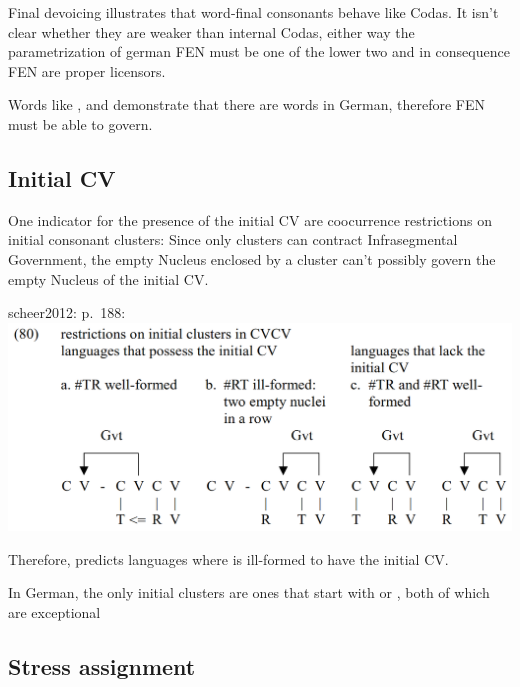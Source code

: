 Final devoicing illustrates that word-final consonants behave like Codas.
It isn't clear whether they are weaker than internal Codas, either way the
parametrization of german FEN must be one of the lower two and in consequence
FEN are proper licensors.

Words like ,  and  demonstrate that there
are  words in German, therefore FEN must be able to govern.


\subsection{Initial CV}
One indicator for the presence of the initial CV are coocurrence restrictions
on initial consonant clusters:
Since only  clusters can contract Infrasegmental Government,
the empty Nucleus enclosed by a  cluster can't possibly govern
the empty Nucleus of the initial CV.

scheer2012: p.~188:
\includegraphics[width=.5\textwidth]{figures/scheer2012_initial-cv-initial-clusters.png}

Therefore, \CVCV predicts languages where  is ill-formed to have
the initial CV.

In German, the only initial  clusters are ones that start with
\textipa{[s]} or \textipa{[S]}, both of which are exceptional \TODO{}



\subsection{Stress assignment}
